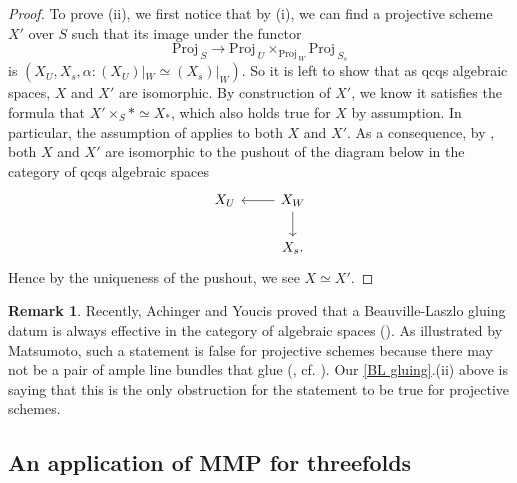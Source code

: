 \documentclass[11pt, letterpaper]{amsart}
\theoremstyle{plain}
\theoremstyle{definition}
\newtheorem{remark}[theorem]{Remark}
\newcommand{\<}{\langle}
\renewcommand{\>}{\rangle}
\newcommand{\Proj}{\mathrm{Proj\,}}
\begin{document}
\begin{proof}
	To prove (ii), we first notice that by (i), we can find a projective scheme $X'$ over $S$ such that its image under the functor
	\[
	\Proj_S \longrightarrow \Proj_U \times_{\Proj_W} \Proj_{S_s}
	\]
	is $(X_U, X_s, \alpha:(X_U)|_W \simeq (X_s)|_W)$.
	So it is left to show that as qcqs algebraic spaces, $X$ and $X'$ are isomorphic.
	By construction of $X'$, we know it satisfies the formula that $X'\times_S \ast \simeq X_\ast$, which also holds true for $X$ by assumption.
	In particular, the assumption of \cite[Prop.~5.6]{Bha16} applies to both $X$ and $X'$.
	As a consequence, by \cite[Prop.~5.6.(6)]{Bha16}, both $X$ and $X'$ are isomorphic to the pushout of the diagram below in the category of qcqs algebraic spaces
	\[
	\begin{tikzcd}
		X_U & X_W \ar[l] \ar[d] \\
		& X_s.
	\end{tikzcd}
    \]
    Hence by the uniqueness of the pushout, we see $X\simeq X'$.
\end{proof}

\begin{remark}
    Recently, Achinger and Youcis proved that a Beauville-Laszlo gluing datum is always effective in the category of algebraic spaces (\cite{AY24}). As illustrated by Matsumoto, such a statement is false for projective schemes because there may not be a pair of ample line bundles that glue (\cite[Ex.~5.2]{Matsumoto}, cf. \cite[Ex.~3.4]{AY24}).
    Our \cref{BL gluing}.(ii) above is saying that this is the only obstruction for the statement to be true for projective schemes. 
\end{remark}


\subsection{An application of MMP for threefolds}
\label{sub:MMP}
\end{document}
